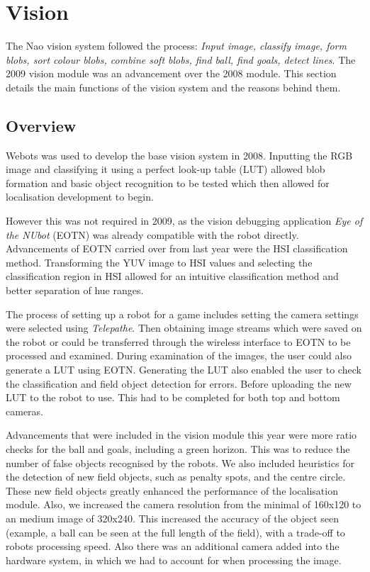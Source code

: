 \section{Vision}
The Nao vision system followed the process: \emph{Input image, classify image, form blobs, sort colour blobs, combine soft blobs, find ball, find goals, detect lines}. The 2009 vision module was an advancement over the 2008 module. This section details the main functions of the vision system and the reasons behind them. 

\subsection{Overview}

Webots was used to develop the base vision system in 2008. Inputting the RGB image and classifying it using a perfect look-up table (LUT) allowed blob formation and basic object recognition to be tested which then allowed for localisation development to begin. 

However this was not required in 2009, as the vision debugging application \emph{Eye of the NUbot} (EOTN) was already compatible with the robot directly. Advancements of EOTN carried over from last year were the HSI classification method. Transforming the YUV image to HSI values and selecting the classification region in HSI allowed for an intuitive classification method and better separation of hue ranges. 

The process of setting up a robot for a game includes setting the camera settings were selected using \emph{Telepathe}. Then obtaining image streams which were saved on the robot or could be transferred through the wireless interface to EOTN to be processed and examined. During examination of the images, the user could also generate a LUT using EOTN. Generating the LUT also enabled the user to check the classification and field object detection for errors. Before uploading the new LUT to the robot to use. This had to be completed for both top and bottom cameras.

Advancements that were included in the vision module this year were more ratio checks for the ball and goals, including a green horizon. This was to reduce the number of false objects recognised by the robots. We also included heuristics for the detection of new field objects, such as penalty spots, and the centre circle. These new field objects greatly enhanced the performance of the localisation module. Also, we increased the camera resolution from the minimal of 160x120 to an medium image of 320x240. This increased the accuracy of the object seen (example, a ball can be seen at the full length of the field), with a trade-off to robots processing speed. Also there was an additional camera added into the hardware system, in which we had to account for when processing the image.



